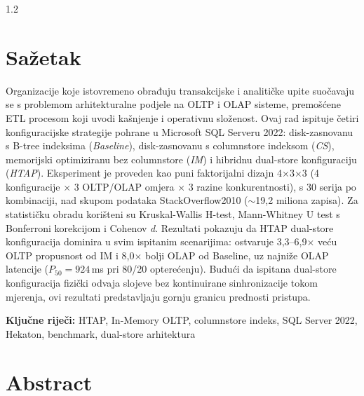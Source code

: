 \begin{spacing}{1.2}
{\small
{}
{}
\section*{Sažetak}

Organizacije koje istovremeno obrađuju transakcijske i analitičke upite suočavaju se s problemom arhitekturalne podjele na OLTP i OLAP sisteme, premošćene ETL procesom koji uvodi kašnjenje i operativnu složenost. Ovaj rad ispituje četiri konfiguracijske strategije pohrane u Microsoft SQL Serveru 2022: disk-zasnovanu s B-tree indeksima (\textit{Baseline}), disk-zasnovanu s columnstore indeksom (\textit{CS}), memorijski optimiziranu bez columnstore (\textit{IM}) i hibridnu dual-store konfiguraciju (\textit{HTAP}). Eksperiment je proveden kao puni faktorijalni dizajn 4$\times$3$\times$3 (4 konfiguracije $\times$ 3 OLTP/OLAP omjera $\times$ 3 razine konkurentnosti), s 30 serija po kombinaciji, nad skupom podataka StackOverflow2010 ($\sim$19,2 miliona zapisa). Za statističku obradu korišteni su Kruskal-Wallis H-test, Mann-Whitney U test s Bonferroni korekcijom i Cohenov \textit{d}. Rezultati pokazuju da HTAP dual-store konfiguracija dominira u svim ispitanim scenarijima: ostvaruje 3,3--6,9$\times$ veću OLTP propusnost od IM i 8,0$\times$ bolji OLAP od Baseline, uz najniže OLAP latencije ($P_{50}=924$\,ms pri 80/20 opterećenju). Budući da ispitana dual-store konfiguracija fizički odvaja slojeve bez kontinuirane sinhronizacije tokom mjerenja, ovi rezultati predstavljaju gornju granicu prednosti pristupa.

\vspace{0.2cm}
\noindent\textbf{Ključne riječi:} HTAP, In-Memory OLTP, columnstore indeks, SQL Server 2022, Hekaton, benchmark, dual-store arhitektura

\vspace{0.3cm}

\section*{Abstract}

}
\end{spacing}

